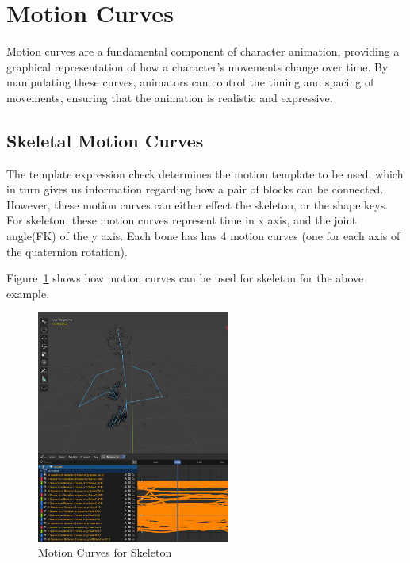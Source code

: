 \documentclass[../../main.tex]{subfiles}
\begin{document}
\section{Motion Curves}
\label{ch:intermediate_blocks_pose_correction:curves}

Motion curves are a fundamental component of character animation, providing a graphical representation of how a character's movements change over time. By manipulating these curves, animators can control the timing and spacing of movements, ensuring that the animation is realistic and expressive.

\subsection{Skeletal Motion Curves}
\label{ch:intermediate_blocks_pose_correction:curves:skeletal}

The template expression check determines the motion template to be used, which in turn gives us information regarding how a pair of blocks can be connected. However, these motion curves can either effect the skeleton, or the shape keys. For skeleton, these motion curves represent time in x axis, and the joint angle(FK) of the y axis. Each bone has has 4 motion curves (one for each axis of the quaternion rotation).

Figure~\ref{fig:motion_curves_skeletal} shows how motion curves can be used for skeleton for the above example.

\begin{figure}
    \centering \includegraphics[width = 2.5in]{chapters/intermediate_blocks/images/motion_curves_skeletal.png}
    \caption{Motion Curves for Skeleton}
    \label{fig:motion_curves_skeletal}
\end{figure}
\end{document}
